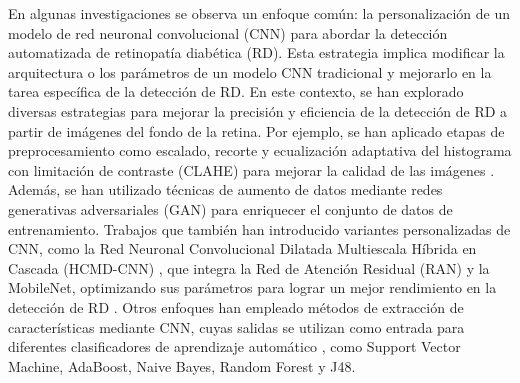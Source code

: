 En algunas investigaciones se observa un enfoque común: la personalización de un modelo de
red neuronal convolucional (CNN) para abordar la detección automatizada de retinopatía
diabética (RD). Esta estrategia implica modificar la arquitectura o los parámetros de un
modelo CNN tradicional y mejorarlo en la tarea específica de la detección de RD. En este
contexto, se han explorado diversas estrategias para mejorar la precisión y eficiencia de
la detección de RD a partir de imágenes del fondo de la retina. Por ejemplo, se han
aplicado etapas de preprocesamiento como escalado, recorte y ecualización adaptativa del
histograma con limitación de contraste (CLAHE) para mejorar la calidad de las imágenes
. Además, se han utilizado técnicas de aumento de datos
mediante redes generativas adversariales (GAN) para enriquecer el conjunto de datos de
entrenamiento. Trabajos que también han introducido variantes personalizadas de CNN, como
la Red Neuronal Convolucional Dilatada Multiescala Híbrida en Cascada (HCMD-CNN)
, que integra la Red de Atención Residual (RAN) y la
MobileNet, optimizando sus parámetros para lograr un mejor rendimiento en la detección de
RD . Otros enfoques han empleado métodos de extracción de características mediante CNN,
cuyas salidas se utilizan como entrada para diferentes clasificadores de aprendizaje
automático  , como Support
Vector Machine, AdaBoost, Naive Bayes, Random Forest y J48.

